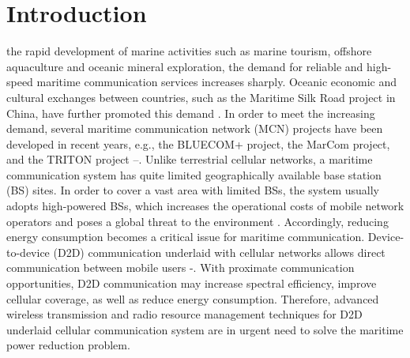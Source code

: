 \documentclass{ieeeaccess}
\begin{document}
\section{Introduction}
 the rapid development of marine activities such as marine tourism, offshore aquaculture and oceanic mineral exploration, the demand for reliable and high-speed maritime communication services increases sharply. Oceanic economic and cultural exchanges between countries, such as the Maritime Silk Road project in China, have further promoted this demand \cite{p322}\cite{p101}. In order to meet the increasing demand, several maritime communication network (MCN) projects have been developed in recent years, e.g., the BLUECOM+ project, the MarCom project, and the TRITON project \cite{p321}--\cite{p32}.
Unlike terrestrial cellular networks, a maritime communication system has quite limited geographically available base station (BS) sites. In order to cover a vast area with limited BSs, the system usually adopts high-powered BSs, which increases the operational costs of mobile network operators and poses a global threat to the environment \cite{p33}.
Accordingly, reducing energy consumption becomes a critical issue for maritime communication.
Device-to-device (D2D) communication underlaid with cellular networks allows direct communication between mobile users \cite{p101}-\cite{p103}. With proximate communication opportunities, D2D communication may increase spectral efficiency, improve cellular coverage, as well as reduce energy consumption.
Therefore, advanced wireless transmission and radio resource management techniques for D2D underlaid cellular communication system are in urgent need to solve the maritime power reduction problem.
\end{document}
